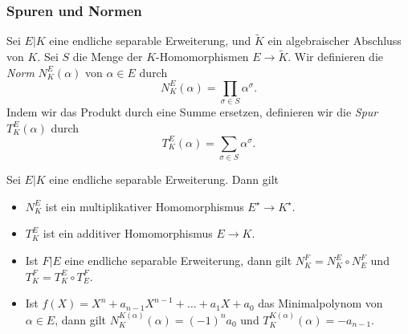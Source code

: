 \documentclass[12pt,a4paper,twoside]{article}
\newcommand{\ei}[1]{\emph{#1}\index{#1}}
\begin{document}
\subsubsection{Spuren und Normen}
Sei $E|K$ eine endliche separable Erweiterung, und $\tilde K$ ein
algebraischer Abschluss von $K$. Sei $S$ die Menge der $K$-Homomorphismen
$E\to\tilde K$. Wir definieren die \ei{Norm} $N_K^E(\alpha)$ von $\alpha\in E$
durch
\[
N_K^E(\alpha)=\prod_{\sigma\in S}\alpha^\sigma.
\]
Indem wir das Produkt durch eine Summe ersetzen, definieren wir die \ei{Spur}
$T_K^E(\alpha)$ durch
\[
T_K^E(\alpha)=\sum_{\sigma\in S}\alpha^\sigma.
\]
\begin{Satz}
  Sei $E|K$ eine endliche separable Erweiterung. Dann gilt
  \begin{itemize}
  \item[(a)] $N_K^E$ ist ein multiplikativer Homomorphismus $E^\star\to
  K^\star$.
\item[(b)] $T_K^E$ ist ein additiver Homomorphismus $E\to K$.
\item[(c)] Ist $F|E$ eine endliche separable Erweiterung, dann gilt
  $N_K^F=N_K^E\circ N_E^F$ und $T_K^F=T_K^E\circ T_E^F$.
\item[(d)] Ist $f(X)=X^n+a_{n-1}X^{n-1}+\dots+a_1X+a_0$ das Minimalpolynom von
  $\alpha\in E$, dann gilt $N_K^{K(\alpha)}(\alpha)=(-1)^na_0$ und
  $T_K^{K(\alpha)}(\alpha)=-a_{n-1}$.
  \end{itemize}
\end{Satz}
\end{document}
